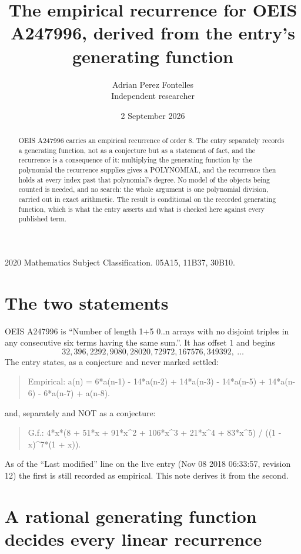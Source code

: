 \documentclass[11pt,a4paper]{article}
\title{The empirical recurrence for OEIS A247996, derived from the entry's generating function}
\author{Adrian Perez Fontelles\\ \small Independent researcher}
\date{2 September 2026}
\theoremstyle{plain}
\theoremstyle{definition}
\begin{document}
\maketitle

\begin{abstract}
OEIS A247996 carries an empirical recurrence of order $8$. The entry separately records a
generating function, not as a conjecture but as a statement of fact, and the recurrence is a
consequence of it: multiplying the generating function by the polynomial the recurrence
supplies gives a POLYNOMIAL, and the recurrence then holds at every index past that
polynomial's degree. No model of the objects being counted is needed, and no search: the
whole argument is one polynomial division, carried out in exact arithmetic. The result is
conditional on the recorded generating function, which is what the entry asserts and what is
checked here against every published term.
\end{abstract}

\noindent\small 2020 Mathematics Subject Classification. 05A15, 11B37, 30B10.\normalsize

\section{The two statements}

OEIS A247996 is ``Number of length 1+5 0..n arrays with no disjoint triples in any consecutive six terms having the same sum.''. It has offset $1$ and begins
\[
32, 396, 2292, 9080, 28020, 72972, 167576, 349392,\ \dots
\]
The entry states, as a conjecture and never marked settled:
\begin{quote}
Empirical: a(n) = 6*a(n-1) - 14*a(n-2) + 14*a(n-3) - 14*a(n-5) + 14*a(n-6) - 6*a(n-7) + a(n-8).
\end{quote}
and, separately and NOT as a conjecture:
\begin{quote}
G.f.: 4*x*(8 + 51*x + 91*x\^{}2 + 106*x\^{}3 + 21*x\^{}4 + 83*x\^{}5) / ((1 - x)\^{}7*(1 + x)).
\end{quote}
As of the ``Last modified'' line on the live entry (Nov 08 2018 06:33:57, revision 12) the first is still
recorded as empirical. This note derives it from the second.

\section{A rational generating function decides every linear recurrence}
\end{document}
